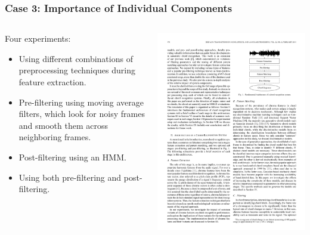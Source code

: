 \documentclass{beamer}
\begin{document}
\begin{frame}
  \frametitle{Case 3: Importance of Individual Components}
    \begin{columns}
	\begin{column}{.6\textwidth}
	Four experiments:
	\begin{itemize}
		\item Using different combinations of preprocessing techniques during feature extraction.
		\item Pre-filtering using moving average filters, which look for noisy frames and smooth them across neighboring frames.
		\item Post-filtering using an HMM.
		\item Using both pre-filtering and post-filtering.
	\end{itemize}
	\end{column}
	\begin{column}{.4\textwidth}
  \includegraphics[width=.95\textwidth]{fig3.pdf}
  	\end{column}
  	\end{columns}
\end{frame}
\end{document}
